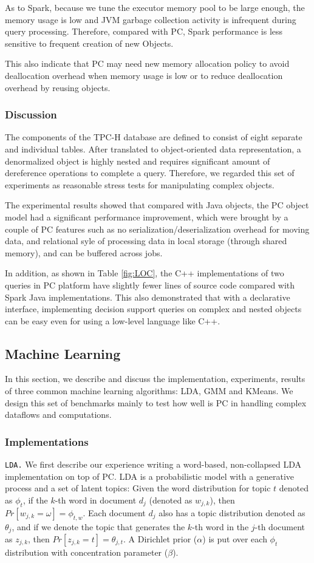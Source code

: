 As to Spark, because we tune the executor memory pool to be large
enough, the memory usage is low and JVM garbage collection activity is infrequent during query
processing. 
Therefore, compared with PC, Spark performance is less
sensitive to frequent creation of new Objects. 

This also indicate that PC may need new memory allocation policy to
avoid deallocation overhead when memory usage is low or to reduce
deallocation overhead by reusing objects.


\subsubsection{Discussion} 
The components of the TPC-H database are defined to
consist of eight separate and individual tables. After translated to
object-oriented data representation, a denormalized object is highly
nested and requires significant amount of dereference
operations to complete a query. Therefore, we regarded this set of
experiments as reasonable stress
tests for manipulating complex objects. 

The experimental results showed that
compared with Java objects, the PC
object model had a significant performance improvement, which were
brought by a couple of PC features such
as no serialization/deserialization overhead for moving data, and
relational syle of processing data in local storage (through shared memory), and can be
buffered across jobs.

In addition, as shown in Table \ref{fig:LOC}, the C++ implementations of two queries in
PC platform have slightly fewer lines of source code compared with
Spark Java implementations. This also demonstrated that with a
declarative interface, implementing decision support
queries on complex and nested objects can be easy even for using a low-level language like C++.

\subsection {Machine Learning}
In this section, we describe and discuss the implementation,
experiments, results of three common machine learning algorithms: LDA,
GMM and KMeans. We design this set of benchmarks mainly to test how
well is PC in handling complex dataflows and computations.

\subsubsection {Implementations}
\noindent
\texttt {LDA.} We first describe our experience writing a word-based,
non-collapsed LDA implementation \cite{jermaineExperimental} on top of
PC.  LDA is a probabilistic model with a generative process and a set
of latent topics: Given the word distribution for topic $t$ denoted
as $\phi_{t}$, if the
$k$-th word in document $d_j$ (denoted as $w_{j,k}$), then
$Pr[w_{j,k}=\omega]=\phi_{t,w}$. Each document $d_j$ also has a topic
distribution denoted as $\theta_j$, and if we denote the topic that
generates the $k$-th word in the $j$-th document as $z_{j,k}$, then
$Pr[z_{j,k}=t]=\theta_{j,t}$. A Dirichlet prior ($\alpha$) is
put over each $\phi_{t}$ distribution with concentration parameter
($\beta$).

